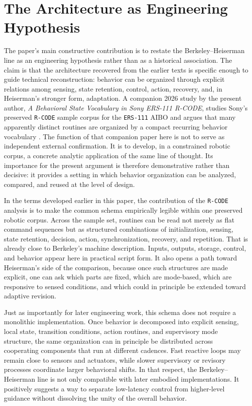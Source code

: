 \documentclass[11pt]{article}
\begin{document}
\section{The Architecture as Engineering Hypothesis}

The paper's main constructive contribution is to restate the Berkeley--Heiserman line as an engineering hypothesis rather than as a historical association. The claim is that the architecture recovered from the earlier texts is specific enough to guide technical reconstruction: behavior can be organized through explicit relations among sensing, state retention, control, action, recovery, and, in Heiserman's stronger form, adaptation. A companion 2026 study by the present author, \emph{A Behavioral State Vocabulary in Sony ERS-111 R-CODE}, studies Sony's preserved \texttt{R-CODE} sample corpus for the \texttt{ERS-111} AIBO and argues that many apparently distinct routines are organized by a compact recurring behavior vocabulary \citep{tucker2026behavioral}. The function of that companion paper here is not to serve as independent external confirmation. It is to develop, in a constrained robotic corpus, a concrete analytic application of the same line of thought. Its importance for the present argument is therefore demonstrative rather than decisive: it provides a setting in which behavior organization can be analyzed, compared, and reused at the level of design.

In the terms developed earlier in this paper, the contribution of the \texttt{R-CODE} analysis is to make the common schema empirically legible within one preserved robotic corpus. Across the sample set, routines can be read not merely as flat command sequences but as structured combinations of initialization, sensing, state retention, decision, action, synchronization, recovery, and repetition. That is already close to Berkeley's machine description. Inputs, outputs, storage, control, and behavior appear here in practical script form. It also opens a path toward Heiserman's side of the comparison, because once such structures are made explicit, one can ask which parts are fixed, which are mode-based, which are responsive to sensed conditions, and which could in principle be extended toward adaptive revision.

Just as importantly for later engineering work, this schema does not require a monolithic implementation. Once behavior is decomposed into explicit sensing, local state, transition conditions, action routines, and supervisory mode structure, the same organization can in principle be distributed across cooperating components that run at different cadences. Fast reactive loops may remain close to sensors and actuators, while slower supervisory or revisory processes coordinate larger behavioral shifts. In that respect, the Berkeley--Heiserman line is not only compatible with later embodied implementations. It positively suggests a way to separate low-latency control from higher-level guidance without dissolving the unity of the overall behavior.
\end{document}
